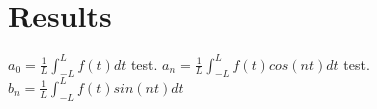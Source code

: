 \section{Results}
\large 
$a_{0}=\frac{1}{L}\int_{-L}^{L}f(t)dt$\newline
test.\newline
$a_{n}=\frac{1}{L}\int_{-L}^{L}f(t)cos(nt)dt$\newline
test.\newline
$b_{n}=\frac{1}{L}\int_{-L}^{L}f(t)sin(nt)dt$
~\cite{Taylor_2016}





